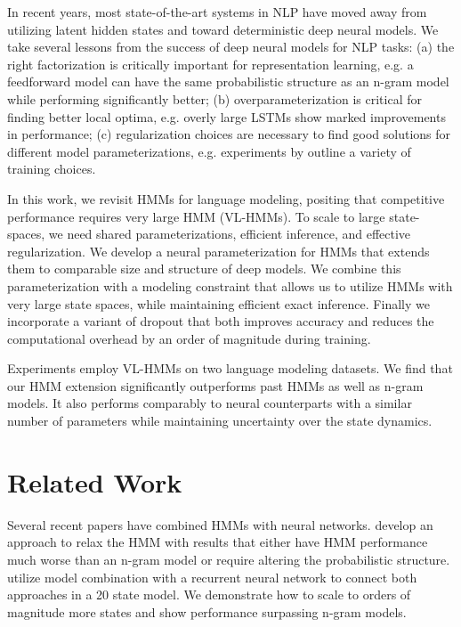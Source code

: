 \documentclass[11pt,a4paper]{article}
\begin{document}
In recent years, most state-of-the-art systems in NLP have moved away from utilizing latent hidden states and toward deterministic deep neural models.
We take several lessons from the success of deep neural models for NLP tasks:
(a) the right factorization is critically important for representation learning, e.g. a feedforward model \cite{bengio2003nlm}
can have the same probabilistic structure as an n-gram model while performing significantly better;
(b) overparameterization is critical for finding better local optima,
e.g. overly large LSTMs \cite{zaremba2014lstm} show marked improvements in performance;
(c) regularization choices are necessary to find good solutions for different model parameterizations,
e.g. experiments by \citet{merity2017awdlstm} outline a variety of training choices.

In this work, we revisit HMMs for language modeling, positing that competitive performance requires very large HMM (VL-HMMs). To scale to large state-spaces, we need  shared parameterizations, efficient inference, and 
effective regularization.
We develop a neural parameterization for HMMs that extends 
them to comparable size and structure of deep models.
We combine this parameterization with a modeling constraint that allows us to utilize HMMs with very large state spaces,
while maintaining efficient exact inference.
Finally we incorporate a variant of dropout that both improves accuracy
and reduces the computational overhead by an order of magnitude during training. 

Experiments employ VL-HMMs on two language modeling datasets. We find that our HMM extension significantly outperforms past HMMs as well as n-gram models. 
It also performs comparably to neural counterparts with a similar number of parameters
while maintaining uncertainty over the state dynamics.

\section{Related Work}

Several recent papers have combined HMMs with 
neural networks. \citet{buys2018hmm}
develop an approach to relax the HMM with results that either have HMM performance much worse than
an n-gram model or require altering the probabilistic structure.  \citet{krakovna2016hmm} utilize model combination with a recurrent neural network to connect both approaches in a 20 state model. We demonstrate how to scale to orders of magnitude more states and show performance surpassing n-gram models.
\end{document}
